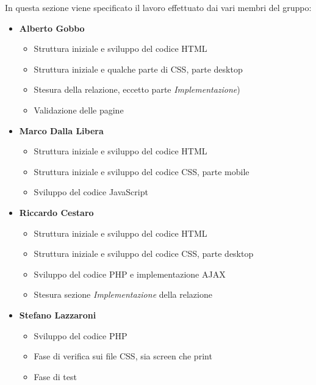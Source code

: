 In questa sezione viene specificato il lavoro effettuato dai vari membri del gruppo:
\begin{itemize}
	\item \textbf{Alberto Gobbo}
	\begin{itemize}
		\item Struttura iniziale e sviluppo del codice HTML
		\item Struttura iniziale e qualche parte di CSS, parte desktop 
		\item Stesura della relazione, eccetto parte \emph{Implementazione})
		\item Validazione delle pagine
	\end{itemize}	
	\item \textbf{Marco Dalla Libera}
	\begin{itemize}
		\item Struttura iniziale e sviluppo del codice HTML
		\item Struttura iniziale e sviluppo del codice CSS, parte mobile
		\item Sviluppo del codice JavaScript
	\end{itemize}	
	\item \textbf{Riccardo Cestaro}
	\begin{itemize}
		\item Struttura iniziale e sviluppo del codice HTML
		\item Struttura iniziale e sviluppo del codice CSS, parte desktop
		\item Sviluppo del codice PHP e implementazione AJAX
		\item Stesura sezione \emph{Implementazione} della relazione
	\end{itemize}	
	\item \textbf{Stefano Lazzaroni}
	\begin{itemize}
		\item Sviluppo del codice PHP
		\item Fase di verifica sui file CSS, sia screen che print
		\item Fase di test 
	\end{itemize}	
\end{itemize}

